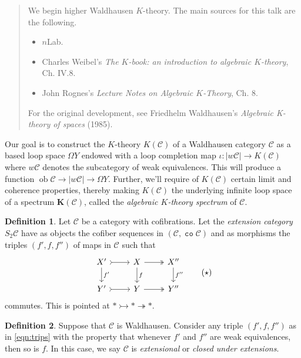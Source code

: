 \documentclass[10pt,letterpaper,cm]{nupset}
\theoremstyle{definition}
\newtheorem{definition}{Definition}
\theoremstyle{theorem}
\theoremstyle{remark}
\newcommand{\1}{\mathbf{1}}
\renewcommand{\c}{\mathscr{C}}
\newcommand{\0}{\vec 0}
\DeclareMathOperator{\co}{\mathtt{co}}
\DeclareMathOperator{\ob}{ob}
\begin{document}
\begin{abstract}
We begin higher Waldhausen $K$-theory. The main sources for this talk are the following.
\begin{itemize}
\item $n$Lab.
\item Charles Weibel's \textit{The $K$-book: an introduction to algebraic $K$-theory},  Ch. IV.8.
\item John Rognes's \textit{Lecture Notes on Algebraic $K$-Theory}, Ch. 8.
\end{itemize}
For the original development, see Friedhelm Waldhausen's \textit{Algebraic K-theory of spaces} (1985). 
\end{abstract}

\smallskip

Our goal is to construct the $K$-theory $K(\c)$ of a Waldhausen category $\c$ as a based loop space $\Omega Y$ endowed with a loop completion map $ \iota : \left\lvert{w{\c}}\right\rvert \to K(\c)$ where $w{\c}$ denotes the subcategory of weak equivalences. This will produce a function $\ob \c \to \left\lvert{w{\c}}\right\rvert \to \Omega Y$. Further, we'll require of $K(\c)$ certain limit and coherence properties, thereby making $K(\c)$ the underlying infinite loop space of a spectrum $\mathbf{K}(\c)$, called the \textit{algebraic $K$-theory spectrum} of $\c$.

\medskip

\begin{definition}

 Let $\c$ be a category with cofibrations. Let the \textit{extension category} $S_2\c$ have as objects the cofiber sequences in $\left(\c, \co{\c}\right)$ and as morphisms the triples $\left(f', f, f''\right)$ of maps in $\c$ such that
\[ \label{eqn:trips}
\begin{tikzcd}
X' \arrow[r, tail] \arrow[d, "f'"] & X \arrow[r, two heads] \arrow[d, "f"] & X'' \arrow[d, "f''"] \\
Y' \arrow[r, tail] & Y \arrow[r, two heads] & Y''
\end{tikzcd}
\tag{$\star$}
\] 
commutes. This is pointed at $\ast \rightarrowtail \ast \twoheadrightarrow \ast$.
\end{definition}

\begin{definition}
Suppose that $\c$ is Waldhausen. Consider any  triple $\left(f', f, f''\right)$ as in \eqref{eqn:trips} with the property that whenever $f'$ and $f''$ are weak equivalences, then so is $f$. In this case, we say $\c$ is \textit{extensional} or \textit{closed under extensions}.
\end{definition}
\end{document}
